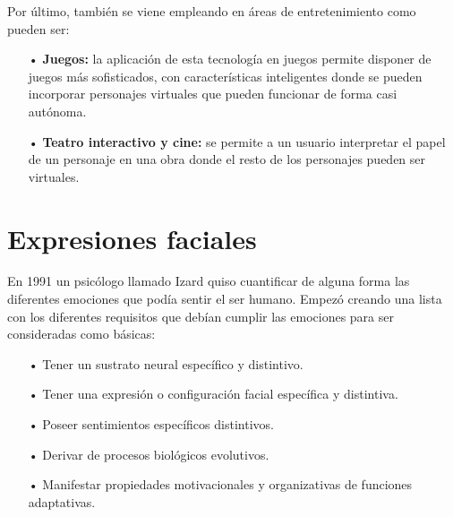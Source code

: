 Por último, también se viene empleando en áreas de entretenimiento como pueden ser:

\begin{itemize}
\item[•] {\bf Juegos:} 
la aplicación de esta tecnología en juegos permite disponer de juegos más sofisticados, con características inteligentes donde se pueden incorporar personajes virtuales que pueden funcionar de forma casi autónoma.

\item[•] {\bf Teatro interactivo y cine:} 
se permite a un usuario interpretar el papel de un personaje en una obra donde el resto de los personajes pueden ser virtuales.
\end{itemize}

\section{Expresiones faciales}

En 1991 un psicólogo llamado Izard quiso cuantificar de alguna forma las diferentes emociones que podía sentir el ser humano. Empezó creando una lista con los diferentes requisitos que debían cumplir las emociones para ser consideradas como básicas:

\begin{itemize}
\item[•] Tener un sustrato neural específico y distintivo.
\item[•] Tener una expresión o configuración facial específica y distintiva.
\item[•] Poseer sentimientos específicos distintivos.
\item[•] Derivar de procesos biológicos evolutivos.
\item[•] Manifestar propiedades motivacionales y organizativas de funciones adaptativas.
\end{itemize}

